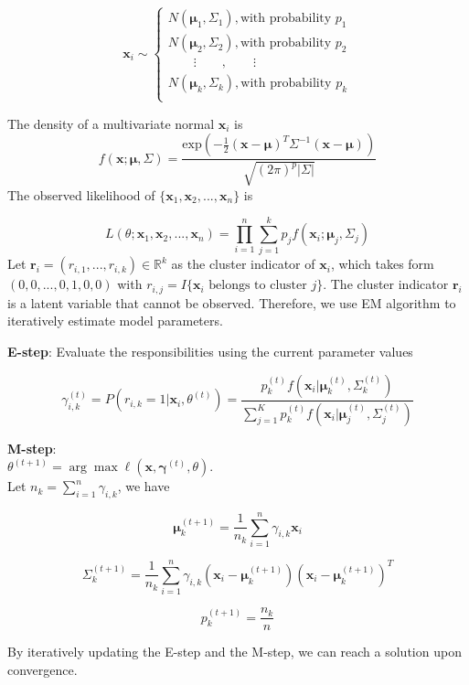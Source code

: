 \documentclass[
]{article}
\begin{document}
\[\mathbf x_i\sim
\begin{cases}
N(\boldsymbol \mu_1, \Sigma_1), \mbox{with probability }p_1 \\
N(\boldsymbol \mu_2, \Sigma_2), \mbox{with probability }p_2\\
\quad\quad\vdots\quad\quad,\quad\quad \vdots\\
N(\boldsymbol \mu_k, \Sigma_k), \mbox{with probability }p_k\\
\end{cases}
\]

The density of a multivariate normal \(\mathbf x_i\) is
\[f(\mathbf x; \boldsymbol \mu, \Sigma) = \frac{\text{exp} (-\frac{1}{2}(\boldsymbol x - \boldsymbol \mu)^T\Sigma^{-1}(\boldsymbol x - \boldsymbol \mu))}{\sqrt{{(2\pi)^p|\Sigma|}}}\]
The observed likelihood of
\(\{\mathbf x_1,\mathbf x_2,...,\mathbf x_n \}\) is

\[L(\theta; \mathbf x_1,\mathbf x_2,...,\mathbf x_n) = \prod_{i=1}^n \sum_{j = 1}^k p_j f(\mathbf x_i; \boldsymbol \mu_j, \Sigma_j)\]
Let \(\mathbf r_i = (r_{i,1},...,r_{i,k})\in \mathbb R^k\) as the
cluster indicator of \(\mathbf x_i\), which takes form
\((0, 0,...,0,1,0,0)\) with
\(r_{i,j} =I\{ \mathbf x_i\mbox{ belongs to cluster } j\}\). The cluster
indicator \(\mathbf r_i\) is a latent variable that cannot be observed.
Therefore, we use EM algorithm to iteratively estimate model parameters.

\textbf{E-step}: Evaluate the responsibilities using the current
parameter values

\[\gamma_{i, k} ^{(t)}= P(r_{i,k}=1 |\mathbf x_i,  \theta^{(t)}) =  
\frac{p_k^{(t)}f(\mathbf x_i|\boldsymbol \mu_k^{(t)}, \Sigma_k^{(t)})}
{\sum_{j=1}^K p_k^{(t)} f(\mathbf x_i|\boldsymbol \mu_j^{(t)}, \Sigma_j^{(t)})}\]

\textbf{M-step}:\\
\(\theta^{(t+1)} = \arg\max\ell( \mathbf{x}, \mathbf{\gamma}^{(t)}, \theta )\).\\
Let \(n_k = \sum_{i=1}^n \gamma_{i, k}\), we have

\[\boldsymbol \mu_k^{(t+1)} = \frac{1}{n_k} \sum_{i=1}^n \gamma_{i, k} \mathbf x_i\]

\[\Sigma_k^{(t+1)} = \frac{1}{n_k} \sum_{i=1}^n \gamma_{i, k} (\mathbf x_i - \boldsymbol \mu_k^{(t+1)})(\mathbf x_i - \boldsymbol \mu_k^{(t+1)})^T\]

\[p_k^{(t+1)} = \frac{n_k}{n}\]

By iteratively updating the E-step and the M-step, we can reach a
solution upon convergence.
\end{document}
